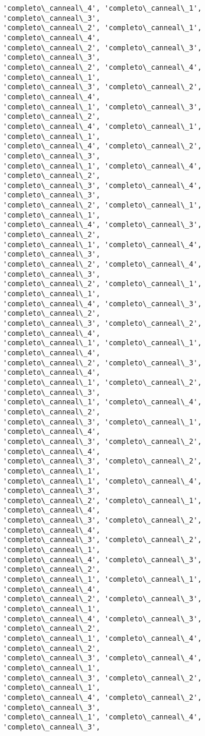 \documentclass[11pt]{article}
\begin{document}
\begin{Verbatim}[commandchars=\\\{\}]
'completo\_canneal\_4', 'completo\_canneal\_1', 'completo\_canneal\_3',
'completo\_canneal\_2', 'completo\_canneal\_1', 'completo\_canneal\_4',
'completo\_canneal\_2', 'completo\_canneal\_3', 'completo\_canneal\_3',
'completo\_canneal\_2', 'completo\_canneal\_4', 'completo\_canneal\_1',
'completo\_canneal\_3', 'completo\_canneal\_2', 'completo\_canneal\_4',
'completo\_canneal\_1', 'completo\_canneal\_3', 'completo\_canneal\_2',
'completo\_canneal\_4', 'completo\_canneal\_1', 'completo\_canneal\_1',
'completo\_canneal\_4', 'completo\_canneal\_2', 'completo\_canneal\_3',
'completo\_canneal\_1', 'completo\_canneal\_4', 'completo\_canneal\_2',
'completo\_canneal\_3', 'completo\_canneal\_4', 'completo\_canneal\_3',
'completo\_canneal\_2', 'completo\_canneal\_1', 'completo\_canneal\_1',
'completo\_canneal\_4', 'completo\_canneal\_3', 'completo\_canneal\_2',
'completo\_canneal\_1', 'completo\_canneal\_4', 'completo\_canneal\_3',
'completo\_canneal\_2', 'completo\_canneal\_4', 'completo\_canneal\_3',
'completo\_canneal\_2', 'completo\_canneal\_1', 'completo\_canneal\_1',
'completo\_canneal\_4', 'completo\_canneal\_3', 'completo\_canneal\_2',
'completo\_canneal\_3', 'completo\_canneal\_2', 'completo\_canneal\_4',
'completo\_canneal\_1', 'completo\_canneal\_1', 'completo\_canneal\_4',
'completo\_canneal\_2', 'completo\_canneal\_3', 'completo\_canneal\_4',
'completo\_canneal\_1', 'completo\_canneal\_2', 'completo\_canneal\_3',
'completo\_canneal\_1', 'completo\_canneal\_4', 'completo\_canneal\_2',
'completo\_canneal\_3', 'completo\_canneal\_1', 'completo\_canneal\_4',
'completo\_canneal\_3', 'completo\_canneal\_2', 'completo\_canneal\_4',
'completo\_canneal\_3', 'completo\_canneal\_2', 'completo\_canneal\_1',
'completo\_canneal\_1', 'completo\_canneal\_4', 'completo\_canneal\_3',
'completo\_canneal\_2', 'completo\_canneal\_1', 'completo\_canneal\_4',
'completo\_canneal\_3', 'completo\_canneal\_2', 'completo\_canneal\_4',
'completo\_canneal\_3', 'completo\_canneal\_2', 'completo\_canneal\_1',
'completo\_canneal\_4', 'completo\_canneal\_3', 'completo\_canneal\_2',
'completo\_canneal\_1', 'completo\_canneal\_1', 'completo\_canneal\_4',
'completo\_canneal\_2', 'completo\_canneal\_3', 'completo\_canneal\_1',
'completo\_canneal\_4', 'completo\_canneal\_3', 'completo\_canneal\_2',
'completo\_canneal\_1', 'completo\_canneal\_4', 'completo\_canneal\_2',
'completo\_canneal\_3', 'completo\_canneal\_4', 'completo\_canneal\_1',
'completo\_canneal\_3', 'completo\_canneal\_2', 'completo\_canneal\_1',
'completo\_canneal\_4', 'completo\_canneal\_2', 'completo\_canneal\_3',
'completo\_canneal\_1', 'completo\_canneal\_4', 'completo\_canneal\_3',

\end{Verbatim}
\end{document}
